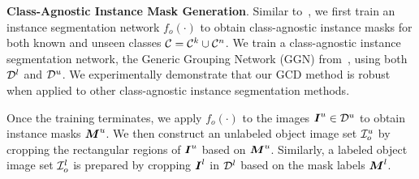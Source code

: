

\vspace{1mm}
\noindent \textbf{Class-Agnostic Instance Mask Generation}.
Similar to~\cite{fomenko2022learning}, we first train an instance segmentation network $f_o(\cdot)$ to obtain class-agnostic instance masks for both known and unseen classes $\mathcal{C} = \mathcal{C}^k \cup \mathcal{C}^n$. We train a class-agnostic instance segmentation network, the Generic Grouping Network (GGN) from~\cite{wang2022open}, using both $\mathcal{D}^l$ and $\mathcal{D}^u$. We experimentally demonstrate that our GCD method is robust when applied to other class-agnostic instance segmentation methods.




Once the training terminates, we apply $f_o(\cdot)$ to the images $\boldsymbol{I}^u \in \mathcal{D}^u$ to obtain instance masks $\boldsymbol{M}^u$. We then construct an unlabeled object image set $\mathcal{I}^u_o$ by cropping the rectangular regions of $\boldsymbol{I}^u$ based on $\boldsymbol{M}^u$. Similarly, a labeled object image set $\mathcal{I}^l_o$ is prepared by cropping $\boldsymbol{I}^l$ in $\mathcal{D}^l$ based on the mask labels $\boldsymbol{M}^l$.











